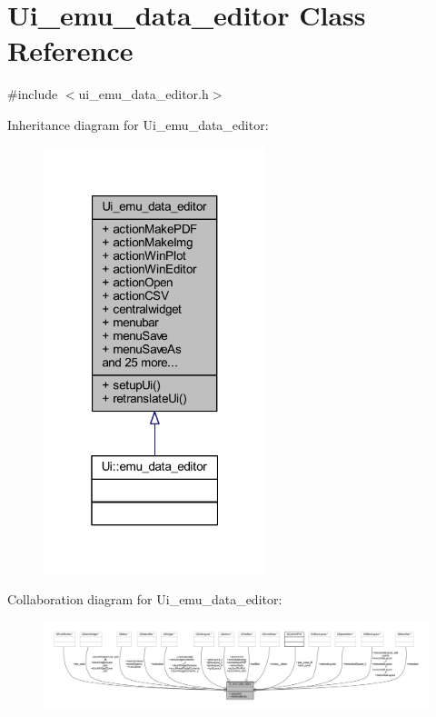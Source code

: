 \hypertarget{a00079}{\section{Ui\+\_\+emu\+\_\+data\+\_\+editor Class Reference}
\label{a00079}
}


{\ttfamily \#include $<$ui\+\_\+emu\+\_\+data\+\_\+editor.\+h$>$}



Inheritance diagram for Ui\+\_\+emu\+\_\+data\+\_\+editor\+:
\nopagebreak
\begin{figure}[H]
\begin{center}
\leavevmode
\includegraphics[width=184pt]{d8/dd2/a00565}
\end{center}
\end{figure}


Collaboration diagram for Ui\+\_\+emu\+\_\+data\+\_\+editor\+:
\nopagebreak
\begin{figure}[H]
\begin{center}
\leavevmode
\includegraphics[width=350pt]{d0/d3e/a00566}
\end{center}
\end{figure}
